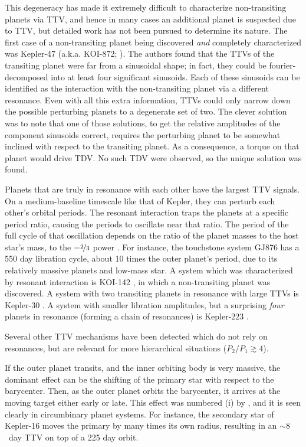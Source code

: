 \documentclass[graybox,natbib,nosecnum]{svmult}
\begin{document}
This degeneracy has made it extremely difficult to characterize non-transiting planets via TTV, and hence in many cases an additional planet is suspected due to TTV, but detailed work has not been pursued to determine its nature.  The first case of a non-transiting planet being discovered \emph{and} completely characterized was Kepler-47 (a.k.a. KOI-872; \citealt{2012Sci...336.1133N}).  The authors found that the TTVs of the transiting planet were far from a sinusoidal shape; in fact, they could be fourier-decomposed into at least four significant sinusoids.  Each of these sinusoids can be identified as the interaction with the non-transiting planet via a different resonance.  Even with all this extra information, TTVs could only narrow down the possible perturbing planets to a degenerate set of two.  The clever solution \citep{2012Sci...336.1133N} was to note that one of those solutions, to get the relative amplitudes of the component sinusoids correct,  requires the perturbing planet to be somewhat inclined with respect to the transiting planet.  As a consequence, a torque on that planet would drive TDV.  No such TDV were observed, so the unique solution was found. 

Planets that are truly in resonance with each other have the largest TTV signals.  On a medium-baseline timescale like that of Kepler, they can perturb each other's orbital periods.  The resonant interaction traps the planets at a specific period ratio, causing the periods to oscillate near that ratio.  The period of the full cycle of that oscillation depends on the ratio of the planet masses to the host star's mass, to the $-\nicefrac{2}{3}$ power \citep{2005MNRAS.359..567A,2016ApJ...823...72N}.  For instance, the touchstone system GJ876 has a 550 day libration cycle, about 10 times the outer planet's period, due to its relatively massive planets and low-mass star.  A system which was characterized by resonant interaction is KOI-142 \citep{2013ApJ...777....3N}, in which a non-transiting planet was discovered.   A system with two transiting planets in resonance with large TTVs is Kepler-30 \citep{2012ApJ...750..114F}.  A system with smaller libration amplitudes, but a surprising \emph{four} planets in resonance (forming a chain of resonances) is Kepler-223 \citep{2016Natur.533..509M}.

Several other TTV mechanisms have been detected which do not rely on resonances, but are relevant for more hierarchical situations ($P_2/P_1 \gtrsim 4$). 

If the outer planet transits, and the inner orbiting body is very massive, the dominant effect can be the shifting of the primary star with respect to the barycenter.   Then, as the outer planet orbits the barycenter, it arrives at the moving target either early or late.  This effect was numbered (i) by \cite{2005MNRAS.359..567A}, and it is seen clearly in circumbinary planet systems.  For instance, the secondary star of Kepler-16 \citep{2011Sci...333.1602D} moves the primary by many times its own radius, resulting in an $\sim 8$~day TTV on top of a 225 day orbit. 
\end{document}
